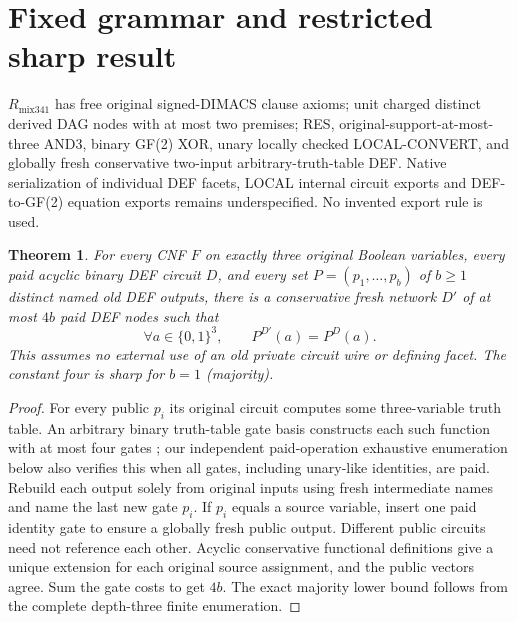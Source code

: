 \documentclass[11pt]{article}
\newtheorem{theorem}{Theorem}
\begin{document}
\section*{Fixed grammar and restricted sharp result}
\noindent $R_{\mathrm{mix341}}$ has free original signed-DIMACS clause axioms; unit charged distinct derived DAG nodes with at most two premises; RES, original-support-at-most-three AND3, binary GF(2) XOR, unary locally checked LOCAL-CONVERT, and globally fresh conservative two-input arbitrary-truth-table DEF. Native serialization of individual DEF facets, LOCAL internal circuit exports and DEF-to-GF(2) equation exports remains underspecified. No invented export rule is used.
\begin{theorem}
For every CNF $F$ on exactly three original Boolean variables, every paid acyclic binary DEF circuit $D$, and every set $P=(p_1,\ldots,p_b)$ of $b\ge1$ distinct named old DEF outputs, there is a conservative fresh network $D'$ of at most $4b$ paid DEF nodes such that
\[
\forall a\in\{0,1\}^3,\qquad P^{D'}(a)=P^D(a).
\]
This assumes no external use of an old private circuit wire or defining facet. The constant four is sharp for $b=1$ (majority).
\end{theorem}
\begin{proof}
For every public $p_i$ its original circuit computes some three-variable truth table. An arbitrary binary truth-table gate basis constructs each such function with at most four gates \cite{Seidler}; our independent paid-operation exhaustive enumeration below also verifies this when all gates, including unary-like identities, are paid. Rebuild each output solely from original inputs using fresh intermediate names and name the last new gate $p_i$. If $p_i$ equals a source variable, insert one paid identity gate to ensure a globally fresh public output. Different public circuits need not reference each other. Acyclic conservative functional definitions give a unique extension for each original source assignment, and the public vectors agree. Sum the gate costs to get $4b$. The exact majority lower bound follows from the complete depth-three finite enumeration.
\end{proof}
\end{document}
